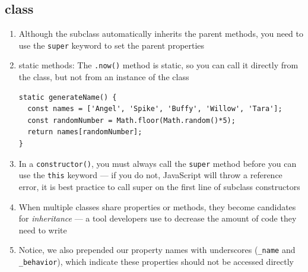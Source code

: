 \documentclass[a4paper, 12pt]{article}
\begin{document}
\subsection{class}
\begin{enumerate}

\item Although the subclass automatically inherits the parent methods, you need to use the \verb|super| keyword to set the parent properties

\item static methods: The \verb|.now()| method is static, so you can call it directly from the class, but not from an instance of the class
\begin{verbatim}
static generateName() {
  const names = ['Angel', 'Spike', 'Buffy', 'Willow', 'Tara'];
  const randomNumber = Math.floor(Math.random()*5);
  return names[randomNumber];
}
\end{verbatim}

\item In a \verb|constructor()|, you must always call the \verb|super| method before you can use the \verb|this| keyword — if you do not, JavaScript will throw a reference error, it is best practice to call super on the first line of subclass constructors

\item When multiple classes share properties or methods, they become candidates for \textit{inheritance} — a tool developers use to decrease the amount of code they need to write

\item Notice, we also prepended our property names with underscores (\verb|_name| and \verb|_behavior|), which indicate these properties should not be accessed directly

\end{enumerate}
\end{document}
